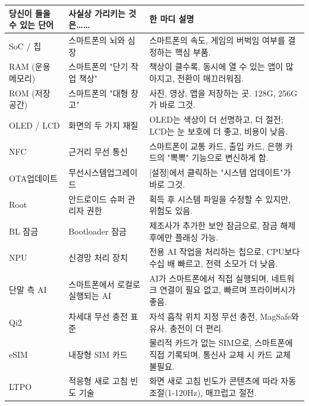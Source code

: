 
\begin{center}
\begin{tabularx}{\linewidth}{|X|X|X|}
\hline
\textbf{당신이 들을 수 있는 단어} & \textbf{사실상 가리키는 것은……} & \textbf{한 마디 설명} \tabularnewline
\hline
SoC / 칩 & 스마트폰의 뇌와 심장 & 스마트폰의 속도, 게임의 버벅임 여부를 결정하는 핵심 부품. \tabularnewline
RAM (운용 메모리) & 스마트폰의 "단기 작업 책상" & 책상이 클수록, 동시에 열 수 있는 앱이 많아지고, 전환이 매끄러워짐. \tabularnewline
ROM (저장 공간) & 스마트폰의 "대형 창고" & 사진, 영상, 앱을 저장하는 곳. 128G, 256G가 바로 그것. \tabularnewline
OLED / LCD & 화면의 두 가지 재질 & OLED는 색상이 더 선명하고, 더 절전; LCD는 눈 보호에 더 좋고, 비용이 낮음. \tabularnewline
NFC & 근거리 무선 통신 & 스마트폰이 교통 카드, 출입 카드, 은행 카드의 "뽁뽁" 기능으로 변신하게 함. \tabularnewline
OTA업데이트 & 무선시스템업그레이드 & {}[설정]에서 클릭하는 "시스템 업데이트"가 바로 그것. \tabularnewline
Root & 안드로이드 슈퍼 관리자 권한 & 획득 후 시스템 파일을 수정할 수 있지만, 위험도 있음. \tabularnewline
BL 잠금 & Bootloader 잠금 & 제조사가 추가한 보안 잠금으로, 잠금 해제 후에만 플래싱 가능. \tabularnewline
NPU & 신경망 처리 장치 & 전용 AI 작업을 처리하는 칩으로, CPU보다 수십 배 빠르고, 전력 소모가 더 낮음. \tabularnewline
단말 측 AI & 스마트폰에서 로컬로 실행되는 AI & AI가 스마트폰에서 직접 실행되며, 네트워크 연결이 필요 없고, 빠르며 프라이버시가 좋음. \tabularnewline
Qi2 & 차세대 무선 충전 표준 & 자석 흡착 위치 지정 무선 충전, MagSafe와 유사, 충전이 더 편리. \tabularnewline
eSIM & 내장형 SIM 카드 & 물리적 카드가 없는 SIM으로, 스마트폰에 직접 기록되며, 통신사 교체 시 카드 교체 불필요. \tabularnewline
LTPO & 적응형 새로 고침 빈도 기술 & 화면 새로 고침 빈도가 콘텐츠에 따라 자동 조절(1-120Hz), 매끄럽고 절전. \tabularnewline
\hline
\end{tabularx}
\end{center}
